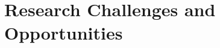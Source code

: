 \documentclass{ieeeaccess}
\begin{document}











\section{Research Challenges and Opportunities}
\label{sec:desafios}
\end{document}
